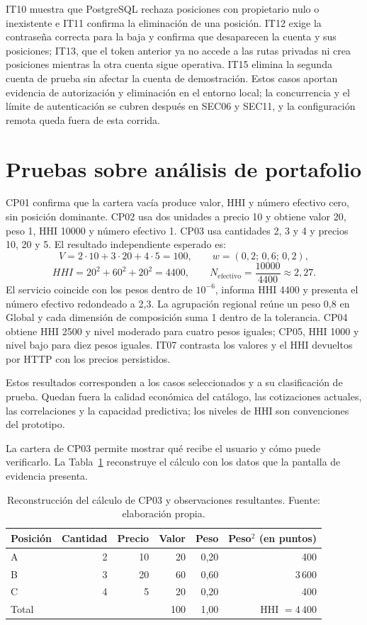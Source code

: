 IT10 muestra que PostgreSQL rechaza posiciones con propietario nulo o inexistente e IT11 confirma la eliminación de una posición. IT12 exige la contraseña correcta para la baja y confirma que desaparecen la cuenta y sus posiciones; IT13, que el token anterior ya no accede a las rutas privadas ni crea posiciones mientras la otra cuenta sigue operativa. IT15 elimina la segunda cuenta de prueba sin afectar la cuenta de demostración. Estos casos aportan evidencia de autorización y eliminación en el entorno local; la concurrencia y el límite de autenticación se cubren después en SEC06 y SEC11, y la configuración remota queda fuera de esta corrida.

\section{Pruebas sobre análisis de portafolio}\label{sec:pruebas-portafolio}

CP01 confirma que la cartera vacía produce valor, HHI y número efectivo cero, sin posición dominante. CP02 usa dos unidades a precio 10 y obtiene valor 20, peso 1, HHI 10000 y número efectivo 1. CP03 usa cantidades 2, 3 y 4 y precios 10, 20 y 5. El resultado independiente esperado es:
\[
V=2\cdot10+3\cdot20+4\cdot5=100,\qquad w=(0{,}2;\,0{,}6;\,0{,}2),
\]
\[
HHI=20^2+60^2+20^2=4400,\qquad N_{\mathrm{efectivo}}=\frac{10000}{4400}\approx2{,}27.
\]
El servicio coincide con los pesos dentro de $10^{-6}$, informa HHI 4400 y presenta el número efectivo redondeado a 2,3. La agrupación regional reúne un peso 0,8 en Global y cada dimensión de composición suma 1 dentro de la tolerancia. CP04 obtiene HHI 2500 y nivel moderado para cuatro pesos iguales; CP05, HHI 1000 y nivel bajo para diez pesos iguales. IT07 contrasta los valores y el HHI devueltos por HTTP con los precios persistidos.

Estos resultados corresponden a los casos seleccionados y a su clasificación de prueba. Quedan fuera la calidad económica del catálogo, las cotizaciones actuales, las correlaciones y la capacidad predictiva; los niveles de HHI son convenciones del prototipo.

La cartera de CP03 permite mostrar qué recibe el usuario y cómo puede verificarlo. La Tabla~\ref{tab:lectura-cp03} reconstruye el cálculo con los datos que la pantalla de evidencia presenta.
\begin{table}[ht]
\centering\small
\caption{Reconstrucción del cálculo de CP03 y observaciones resultantes. Fuente: elaboración propia.}\label{tab:lectura-cp03}
\begin{tabular}{lrrrrr}\hline
\textbf{Posición} & \textbf{Cantidad} & \textbf{Precio} & \textbf{Valor} & \textbf{Peso} & \textbf{Peso$^2$ (en puntos)}\\\hline
A & 2 & 10 & 20 & 0,20 & 400\\
B & 3 & 20 & 60 & 0,60 & 3\,600\\
C & 4 & 5 & 20 & 0,20 & 400\\\hline
Total & & & 100 & 1,00 & HHI $=4\,400$\\\hline
\end{tabular}
\end{table}

